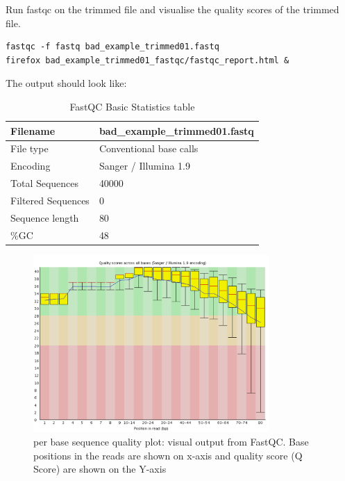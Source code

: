 \begin{steps}
Run fastqc on the trimmed file and visualise the quality scores of the trimmed file.
\begin{lstlisting}
fastqc -f fastq bad_example_trimmed01.fastq
firefox bad_example_trimmed01_fastqc/fastqc_report.html &
\end{lstlisting}

The output should look like:

\begin{table}[H]
  \centering
  \caption{FastQC Basic Statistics table}
    \begin{tabular}{ll}
    \toprule
    Filename & bad\_example\_trimmed01.fastq \\
    \midrule
    File type & Conventional base calls \\
    Encoding & Sanger / Illumina 1.9 \\
    Total Sequences & 40000 \\
    Filtered Sequences & 0 \\
    Sequence length & 80 \\
    \%GC  & 48 \\
    \bottomrule
    \end{tabular}%
  \label{tab:badexampletrimmed}%
\end{table}%

\begin{figure}[H]
\centering
\includegraphics[width=0.8\textwidth]{ngs-qc/bad_example_trimmed_to_80bp.png}
\caption{per base sequence quality plot: visual output from FastQC. Base positions in the reads are shown on x-axis and quality score (Q Score) are shown on the Y-axis}
\label{fig:bad_example_trimmed_plot}
\end{figure}

\end{steps}

